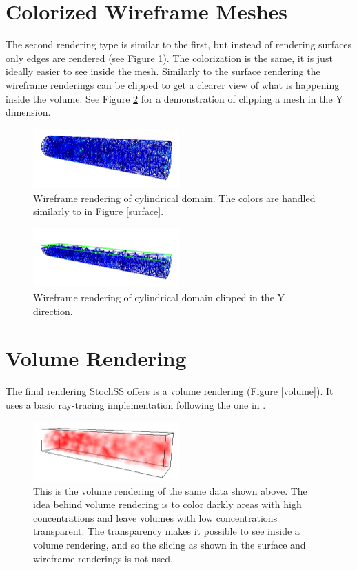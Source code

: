 \section{Colorized Wireframe Meshes}

The second rendering type is similar to the first, but instead of rendering surfaces only edges are rendered (see Figure \ref{wireframe}). The colorization is the same, it is just ideally easier to see inside the mesh. Similarly to the surface rendering the wireframe renderings can be clipped to get a clearer view of what is happening inside the volume. See Figure \ref{clipy} for a demonstration of clipping a mesh in the Y dimension.

\begin{figure}[!ht]
  \centering
    \includegraphics[width=0.5\textwidth]{Vis/wireframe}
  \caption{ Wireframe rendering of cylindrical domain. The colors are handled similarly to in Figure \ref{surface}. }
  \label{wireframe}
\end{figure}

\begin{figure}[!ht]
  \centering
    \includegraphics[width=0.5\textwidth]{Vis/clipy}
  \caption{ Wireframe rendering of cylindrical domain clipped in the Y direction. }
  \label{clipy}
\end{figure}

\section{Volume Rendering}

The final rendering StochSS offers is a volume rendering (Figure \ref{volume}). It uses a basic ray-tracing implementation following the one in \cite{congote}.

\begin{figure}[!ht]
  \centering
    \includegraphics[width=0.5\textwidth]{Vis/volume}
  \caption{ This is the volume rendering of the same data shown above. The idea behind volume rendering is to color darkly areas with high concentrations and leave volumes with low concentrations transparent. The transparency makes it possible to see inside a volume rendering, and so the slicing as shown in the surface and wireframe renderings is not used. }
  \label{ volume }
\end{figure}

